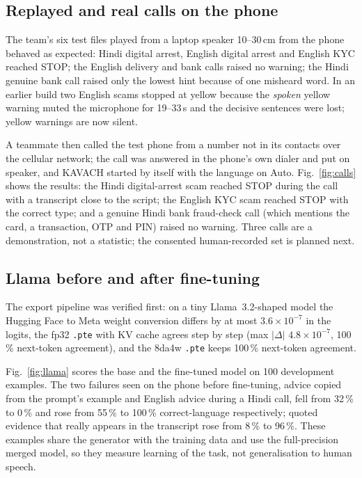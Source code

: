 \documentclass[conference]{IEEEtran}
\begin{document}
\subsection{Replayed and real calls on the phone}
The team's six test files played from a laptop speaker 10--30\,cm from the phone behaved as expected: Hindi digital arrest, English digital arrest and English KYC reached STOP; the English delivery and bank calls raised no warning; the Hindi genuine bank call raised only the lowest hint because of one misheard word. In an earlier build two English scams stopped at yellow because the \emph{spoken} yellow warning muted the microphone for 19--33\,s and the decisive sentences were lost; yellow warnings are now silent.

A teammate then called the test phone from a number not in its contacts over the cellular network; the call was answered in the phone's own dialer and put on speaker, and KAVACH started by itself with the language on Auto. Fig.~\ref{fig:calls} shows the results: the Hindi digital-arrest scam reached STOP during the call with a transcript close to the script; the English KYC scam reached STOP with the correct type; and a genuine Hindi bank fraud-check call (which mentions the card, a transaction, OTP and PIN) raised no warning. Three calls are a demonstration, not a statistic; the consented human-recorded set is planned next.

\subsection{Llama before and after fine-tuning}\label{sec:llamaeval}
The export pipeline was verified first: on a tiny Llama~3.2-shaped model the Hugging Face to Meta weight conversion differs by at most $3.6\times10^{-7}$ in the logits, the fp32 \texttt{.pte} with KV cache agrees step by step (max $|\Delta|$ $4.8\times10^{-7}$, 100\,\% next-token agreement), and the 8da4w \texttt{.pte} keeps 100\,\% next-token agreement.

Fig.~\ref{fig:llama} scores the base and the fine-tuned model on 100 development examples. The two failures seen on the phone before fine-tuning, advice copied from the prompt's example and English advice during a Hindi call, fell from 32\,\% to 0\,\% and rose from 55\,\% to 100\,\% correct-language respectively; quoted evidence that really appears in the transcript rose from 8\,\% to 96\,\%. These examples share the generator with the training data and use the full-precision merged model, so they measure learning of the task, not generalisation to human speech.
\end{document}
